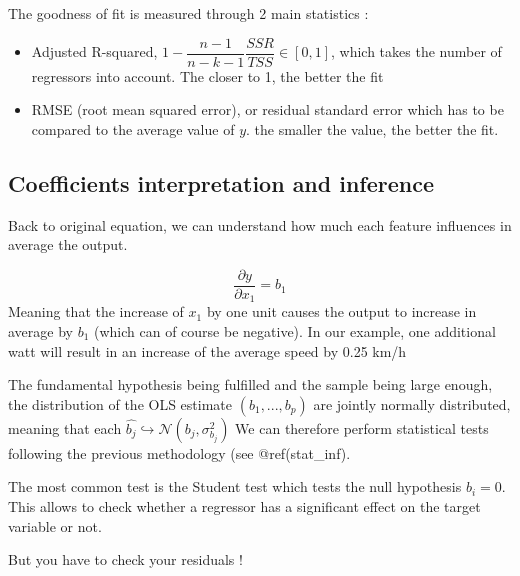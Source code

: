 \documentclass[
]{book}
\newenvironment{Shaded}{\begin{snugshade}}{\end{snugshade}}
\newcommand{\DataTypeTok}[1]{\textcolor[rgb]{0.13,0.29,0.53}{#1}}
\newcommand{\KeywordTok}[1]{\textcolor[rgb]{0.13,0.29,0.53}{\textbf{#1}}}
\newcommand{\NormalTok}[1]{#1}
\newcommand{\OperatorTok}[1]{\textcolor[rgb]{0.81,0.36,0.00}{\textbf{#1}}}
\newcommand{\StringTok}[1]{\textcolor[rgb]{0.31,0.60,0.02}{#1}}
\providecommand{\tightlist}{%
  \setlength{\itemsep}{0pt}\setlength{\parskip}{0pt}}
\begin{document}
The goodness of fit is measured through 2 main statistics :

\begin{itemize}
\tightlist
\item
  Adjusted R-squared, \(1- \dfrac{n-1}{n-k-1} \dfrac{SSR}{TSS} \in [0,1]\), which takes the number of regressors into account. The closer to 1, the better the fit
\item
  RMSE (root mean squared error), or residual standard error which has to be compared to the average value of \(y\). the smaller the value, the better the fit.
\end{itemize}

\hypertarget{coefficients-interpretation-and-inference}{%
\subsection{Coefficients interpretation and inference}\label{coefficients-interpretation-and-inference}}

Back to original equation, we can understand how much each feature influences in average the output.

\[ \dfrac{\partial y}{\partial x_1} = b_1\]
Meaning that the increase of \(x_1\) by one unit causes the output to increase in average by \(b_1\) (which can of course be negative). In our example, one additional watt will result in an increase of the average speed by 0.25 km/h

The fundamental hypothesis being fulfilled and the sample being large enough, the distribution of the OLS estimate \((b_1,...,b_p)\) are jointly normally distributed, meaning that each \(\hat{b_j} \hookrightarrow \mathcal{N}(b_j,\sigma_{b_j}^2)\)
We can therefore perform statistical tests following the previous methodology (see @ref(stat\_inf).

The most common test is the Student test which tests the null hypothesis \(b_i=0\). This allows to check whether a regressor has a significant effect on the target variable or not.

But you have to check your residuals !

\begin{Shaded}
\end{Shaded}
\end{document}
